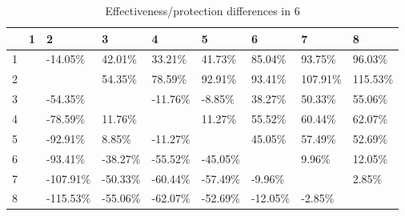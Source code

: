 \begin{table}[ht]
\centering
\begin{tabular}{rllllllll}
  \hline
 & 1 & 2 & 3 & 4 & 5 & 6 & 7 & 8 \\ 
  \hline
1 &  & -14.05\% & 42.01\% & 33.21\% & 41.73\% & 85.04\% & 93.75\% & 96.03\% \\ 
  2 &  &  & 54.35\% & 78.59\% & 92.91\% & 93.41\% & 107.91\% & 115.53\% \\ 
  3 &  & -54.35\% &  & -11.76\% & -8.85\% & 38.27\% & 50.33\% & 55.06\% \\ 
  4 &  & -78.59\% & 11.76\% &  & 11.27\% & 55.52\% & 60.44\% & 62.07\% \\ 
  5 &  & -92.91\% & 8.85\% & -11.27\% &  & 45.05\% & 57.49\% & 52.69\% \\ 
  6 &  & -93.41\% & -38.27\% & -55.52\% & -45.05\% &  & 9.96\% & 12.05\% \\ 
  7 &  & -107.91\% & -50.33\% & -60.44\% & -57.49\% & -9.96\% &  & 2.85\% \\ 
  8 &  & -115.53\% & -55.06\% & -62.07\% & -52.69\% & -12.05\% & -2.85\% &  \\ 
   \hline
\end{tabular}
\caption{Effectiveness/protection differences in  6} 
\end{table}
